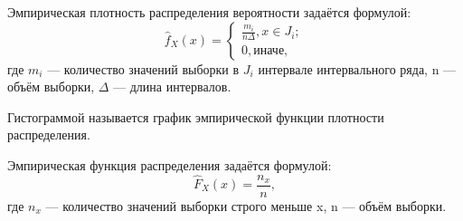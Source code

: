 \documentclass[a4paper, 14pt, unknownkeysallowed]{extreport}
\begin{document}
Эмпирическая плотность распределения вероятности задаётся формулой:
\begin{equation}
	\hat{f}_X(x) = \begin{cases}
		\frac{m_i}{n\Delta}, x \in J_i; \\
		0, \text{иначе},
	\end{cases}
\end{equation}
где $m_i$ --- количество значений выборки в $J_i$ интервале интервального ряда, n --- объём выборки, $\Delta$ --- длина интервалов.

Гистограммой называется график эмпирической функции плотности распределения.

Эмпирическая функция распределения задаётся формулой:
\begin{equation}
	\hat{F}_X(x) = \frac{n_x}{n},
\end{equation}
где $n_x$ --- количество значений выборки строго меньше x, n --- объём выборки.
\end{document}
